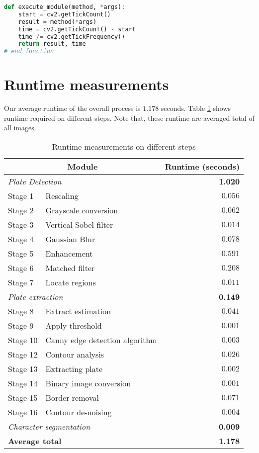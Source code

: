 \begin{lstlisting}[language=Python]
def execute_module(method, *args):
    start = cv2.getTickCount()
    result = method(*args)
    time = cv2.getTickCount() - start
    time /= cv2.getTickFrequency()
    return result, time
# end function
\end{lstlisting}


\section{Runtime measurements}
Our average runtime of the overall process is $1.178$ seconds. Table \ref{table:Runtimes} shows runtime required on different steps. Note that, these runtime are averaged total of all images.


\begin{table}[hb]
\centering
\caption{Runtime measurements on different steps}
\label{table:Runtimes}
\begin{tabular}{|l|l|r|}
\hline
\multicolumn{2}{|c|}{\bf Module}  & {\bf Runtime (seconds)} \\
\hline
\multicolumn{2}{|l|}{\it Plate Detection} & {\bf 1.020} \\ 
\hline
Stage 1 & Rescaling & $0.056$ \\
Stage 2 & Grayscale conversion & $0.062$ \\
Stage 3 & Vertical Sobel filter & $0.014$ \\
Stage 4 & Gaussian Blur & $0.078$ \\
Stage 5 & Enhancement & $0.591$ \\
Stage 6 & Matched filter & $0.208$ \\
Stage 7 & Locate regions & $0.011$ \\
\hline
\multicolumn{2}{|l|}{\it Plate extraction} & {\bf 0.149} \\ 
\hline
Stage 8 & Extract estimation & $0.041$ \\ 
Stage 9 & Apply threshold & $0.001$ \\ 
Stage 10 & Canny edge detection algorithm & $0.003$  \\ 
Stage 12 & Contour analysis & $0.026$ \\ 
Stage 13 & Extracting plate & $0.002$ \\ 
Stage 14 & Binary image conversion & $0.001$ \\ 
Stage 15 & Border removal & $0.071$ \\ 
Stage 16 & Contour de-noising & $0.004$ \\
\hline
\multicolumn{2}{|l|}{\it Character segmentation} & {\bf 0.009} \\ 
\hline
\multicolumn{2}{|l|}{\bf Average total} & {\bf 1.178} \\ 
\hline
\end{tabular}
\end{table} 

